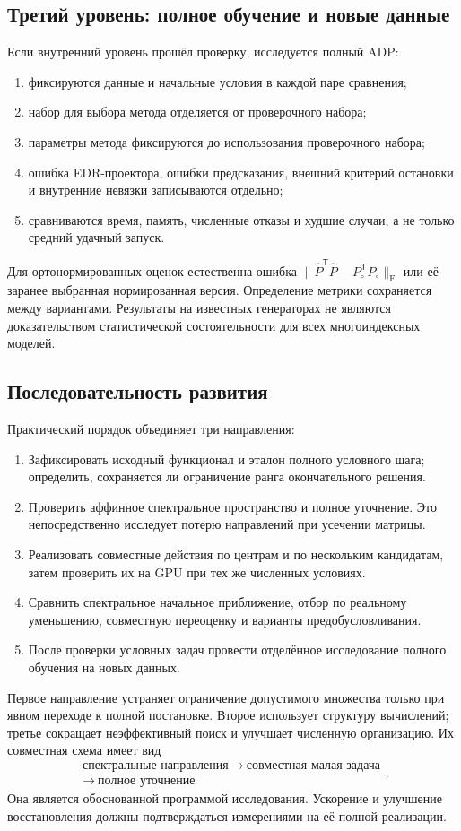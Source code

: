 \documentclass[11pt,a4paper]{article}
\numberwithin{equation}{section}
\theoremstyle{remark}
\newcommand{\T}{^{\mathsf T}}
\newcommand{\F}{_{\mathrm F}}
\begin{document}
\subsection{Третий уровень: полное обучение и новые данные}
Если внутренний уровень прошёл проверку, исследуется полный ADP:
\begin{enumerate}
 \item фиксируются данные и начальные условия в каждой паре сравнения;
 \item набор для выбора метода отделяется от проверочного набора;
 \item параметры метода фиксируются до использования проверочного набора;
 \item ошибка EDR-проектора, ошибки предсказания, внешний критерий
 остановки и внутренние невязки записываются отдельно;
 \item сравниваются время, память, численные отказы и худшие случаи,
 а не только средний удачный запуск.
\end{enumerate}
Для ортонормированных оценок естественна ошибка
$\|\widehat P\T\widehat P-P_\circ\T P_\circ\|\F$
или её заранее выбранная нормированная версия.
Определение метрики сохраняется между вариантами.
Результаты на известных генераторах не являются доказательством
статистической состоятельности для всех многоиндексных моделей.

\subsection{Последовательность развития}
Практический порядок объединяет три направления:
\begin{enumerate}
 \item Зафиксировать исходный функционал и эталон полного условного шага;
 определить, сохраняется ли ограничение ранга окончательного решения.
 \item Проверить аффинное спектральное пространство и полное уточнение.
 Это непосредственно исследует потерю направлений при усечении матрицы.
 \item Реализовать совместные действия по центрам и по нескольким
 кандидатам, затем проверить их на GPU при тех же численных условиях.
 \item Сравнить спектральное начальное приближение, отбор по реальному уменьшению,
 совместную переоценку и варианты предобусловливания.
 \item После проверки условных задач провести отделённое исследование
 полного обучения на новых данных.
\end{enumerate}
Первое направление устраняет ограничение допустимого множества только
при явном переходе к полной постановке. Второе использует структуру
вычислений; третье сокращает неэффективный поиск и улучшает численную
организацию. Их совместная схема имеет вид
\[
 \boxed{\begin{gathered}
 \text{спектральные направления}
 \ \longrightarrow\ \text{совместная малая задача}\\
 \longrightarrow\ \text{полное уточнение}
 \end{gathered}}.
\]
Она является обоснованной программой исследования. Ускорение и улучшение
восстановления должны подтверждаться измерениями на её полной реализации.
\end{document}
